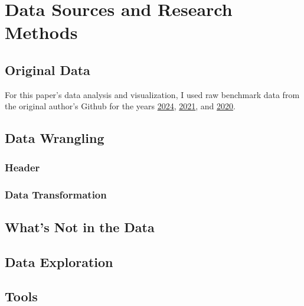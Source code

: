 %
%

\pagebreak
\section{Data Sources and Research Methods}

\onehalfspacing

\subsection{Original Data}

For this paper's data analysis and visualization, I used raw benchmark data from the original author's Github for the years \href{https://github.com/InfraBuilder/benchmark-k8s-cni-2024-01}{2024}, \href{https://github.com/InfraBuilder/benchmark-k8s-cni-2021-05}{2021}, and \href{https://github.com/InfraBuilder/benchmark-k8s-cni-2020-08}{2020}.

\subsection{Data Wrangling}

\subsubsection{Header}

\subsubsection{Data Transformation}

\subsection{What's Not in the Data}

\subsection{Data Exploration}

\subsection{Tools}
